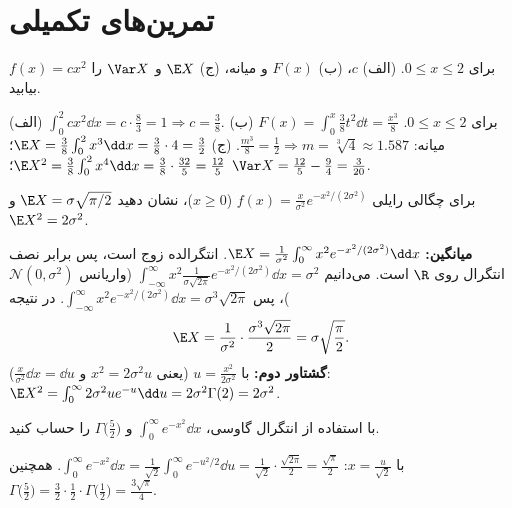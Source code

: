 \section{تمرین‌های تکمیلی}

\begin{exercise}
$f(x)=cx^2$ برای $0\le x\le2$. (الف) $c$، (ب) $F(x)$ و میانه، (ج) $\E X$ و $\Var X$ را بیابید.
\end{exercise}
\begin{solution}
(الف) $\int_0^2cx^2\dd x=c\cdot\frac83=1\Rightarrow c=\frac38$.
(ب) $F(x)=\int_0^x\frac38t^2\dd t=\frac{x^3}{8}$ برای $0\le x\le2$. میانه: $\frac{m^3}{8}=\frac12\Rightarrow m=\sqrt[3]4\approx1.587$.
(ج) $\E X=\frac38\int_0^2x^3\dd x=\frac38\cdot4=\frac32$؛ $\E X^2=\frac38\int_0^2x^4\dd x=\frac38\cdot\frac{32}{5}=\frac{12}{5}$؛ $\Var X=\frac{12}{5}-\frac94=\frac{3}{20}$.
\end{solution}

\begin{exercise}
برای چگالی رایلی $f(x)=\frac{x}{\sigma^2}e^{-x^2/(2\sigma^2)}$ ($x\ge0$)، نشان دهید $\E X=\sigma\sqrt{\pi/2}$ و $\E X^2=2\sigma^2$.
\end{exercise}
\begin{solution}
\textbf{میانگین:} $\E X=\frac{1}{\sigma^2}\int_0^\infty x^2e^{-x^2/(2\sigma^2)}\dd x$. انتگرالده زوج است، پس برابر نصف انتگرال روی $\R$ است. می‌دانیم $\int_{-\infty}^\infty x^2\frac{1}{\sigma\sqrt{2\pi}}e^{-x^2/(2\sigma^2)}\dd x=\sigma^2$ (واریانس $\mathcal N(0,\sigma^2)$)، پس $\int_{-\infty}^\infty x^2e^{-x^2/(2\sigma^2)}\dd x=\sigma^3\sqrt{2\pi}$. در نتیجه
\[
\E X=\frac{1}{\sigma^2}\cdot\frac{\sigma^3\sqrt{2\pi}}{2}=\sigma\sqrt{\frac\pi2}.
\]
\textbf{گشتاور دوم:} با $u=\frac{x^2}{2\sigma^2}$ (یعنی $x^2=2\sigma^2u$ و $\frac{x}{\sigma^2}\dd x=\dd u$): $\E X^2=\int_0^\infty2\sigma^2ue^{-u}\dd u=2\sigma^2\Gamma(2)=2\sigma^2$.
\end{solution}

\begin{exercise}
با استفاده از انتگرال گاوسی، $\int_0^\infty e^{-x^2}\dd x$ و $\Gamma\big(\frac52\big)$ را حساب کنید.
\end{exercise}
\begin{solution}
با $x=\frac{u}{\sqrt2}$: $\int_0^\infty e^{-x^2}\dd x=\frac{1}{\sqrt2}\int_0^\infty e^{-u^2/2}\dd u=\frac{1}{\sqrt2}\cdot\frac{\sqrt{2\pi}}{2}=\frac{\sqrt\pi}{2}$. همچنین $\Gamma\big(\frac52\big)=\frac32\cdot\frac12\cdot\Gamma\big(\frac12\big)=\frac{3\sqrt\pi}{4}$.
\end{solution}

